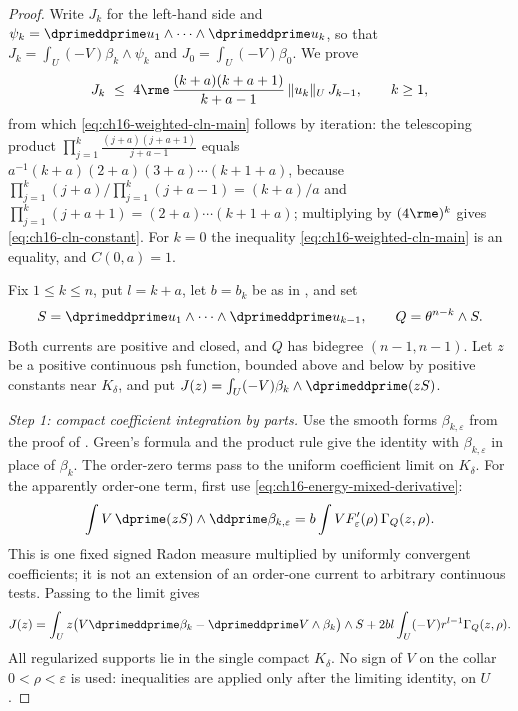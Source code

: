 \begin{proof}
Write $J_k$ for the left-hand side and
$\psi_k=\dprimeddprime u_1\wedge\cdots\wedge\dprimeddprime u_k$, so that
$J_k=\int_U(-V)\beta_k\wedge\psi_k$ and $J_0=\int_U(-V)\beta_0$.  We prove
\begin{equation}
\label{eq:ch16-cln-recursion}
 J_k\ \leq\ 4\rme\,\frac{(k+a)(k+a+1)}{k+a-1}\,\|u_k\|_U\,J_{k-1},
 \qquad k\geq1,
\end{equation}
from which \eqref{eq:ch16-weighted-cln-main} follows by iteration: the
telescoping product
$\prod_{j=1}^k\frac{(j+a)(j+a+1)}{j+a-1}$ equals
$a^{-1}(k+a)(2+a)(3+a)\cdots(k+1+a)$, because
$\prod_{j=1}^k(j+a)\big/\prod_{j=1}^k(j+a-1)=(k+a)/a$ and
$\prod_{j=1}^k(j+a+1)=(2+a)\cdots(k+1+a)$; multiplying by $(4\rme)^k$ gives
\eqref{eq:ch16-cln-constant}.  For $k=0$ the inequality
\eqref{eq:ch16-weighted-cln-main} is an equality, and $C(0,a)=1$.

Fix $1\leq k\leq n$, put $l=k+a$, let $b=b_k$ be as in
, and set
\[
 S=\dprimeddprime u_1\wedge\cdots\wedge\dprimeddprime u_{k-1},
 \qquad Q=\theta^{n-k}\wedge S.
\]
Both currents are positive and closed, and $Q$ has bidegree
$(n-1,n-1)$.  Let $z$ be a positive continuous psh function, bounded above
and below by positive constants near $K_\delta$, and put
$J(z)=\int_U(-V)\beta_k\wedge\dprimeddprime(zS)$.

\emph{Step 1: compact coefficient integration by parts.}
Use the smooth forms $\beta_{k,\varepsilon}$ from the proof of
.  Green's formula and the product rule give
the identity with $\beta_{k,\varepsilon}$ in place of $\beta_k$.  The
order-zero terms pass to the uniform coefficient limit on $K_\delta$.
For the apparently order-one term, first use
\eqref{eq:ch16-energy-mixed-derivative}:
\[
 \int V\,\dprime(zS)\wedge\ddprime\beta_{k,\varepsilon}
 =b\int V F_\varepsilon'(\rho)\,\Gamma_Q(z,\rho).
\]
This is one fixed signed Radon measure multiplied by uniformly convergent
coefficients; it is not an extension of an order-one current to arbitrary
continuous tests.  Passing to the limit gives
\begin{equation}
\label{eq:ch16-cln-after-parts}
 J(z)=\int_U z\bigl(V\dprimeddprime\beta_k
     -\dprimeddprime V\wedge\beta_k\bigr)\wedge S
   +2bl\int_U(-V)r^{l-1}\Gamma_Q(z,\rho).
\end{equation}
All regularized supports lie in the single compact $K_\delta$.  No sign of
$V$ on the collar $0<\rho<\varepsilon$ is used: inequalities are applied
only after the limiting identity, on $U$.


\end{proof}
